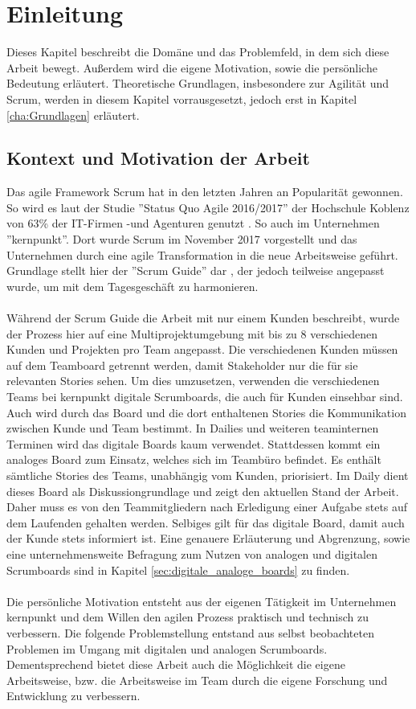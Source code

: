 \chapter{Einleitung}
\label{cha:Einleitung}

Dieses Kapitel beschreibt die Domäne und das Problemfeld, in dem sich diese Arbeit bewegt. Außerdem wird die eigene Motivation, sowie die persönliche Bedeutung erläutert. Theoretische Grundlagen, insbesondere zur Agilität und Scrum, werden in diesem Kapitel vorrausgesetzt, jedoch erst in Kapitel \ref{cha:Grundlagen} erläutert.

\section{Kontext und Motivation der Arbeit}
\label{sec:kontext_motivation}
Das agile Framework Scrum hat in den letzten Jahren an Popularität gewonnen. So wird es laut der Studie ''Status Quo Agile 2016/2017'' der Hochschule Koblenz von 63\% der IT-Firmen -und Agenturen genutzt \cite{statusquoagile}. So auch im Unternehmen ''kernpunkt''. Dort wurde Scrum im November 2017 vorgestellt und das Unternehmen durch eine agile Transformation in die neue Arbeitsweise geführt. Grundlage stellt hier der ''Scrum Guide'' dar \cite{scrumguide}, der jedoch teilweise angepasst wurde, um mit dem Tagesgeschäft zu harmonieren. 
\\ \\
Während der Scrum Guide die Arbeit mit nur einem Kunden beschreibt, wurde der Prozess hier auf eine Multiprojektumgebung mit bis zu 8 verschiedenen Kunden und Projekten pro Team angepasst. Die verschiedenen Kunden müssen auf dem Teamboard getrennt werden, damit Stakeholder nur die für sie relevanten Stories sehen. Um dies umzusetzen, verwenden die verschiedenen Teams bei kernpunkt digitale Scrumboards, die auch für Kunden einsehbar sind. Auch wird durch das Board und die dort enthaltenen Stories die Kommunikation zwischen Kunde und Team bestimmt. In Dailies und weiteren teaminternen Terminen wird das digitale Boards kaum verwendet. Stattdessen kommt ein analoges Board zum Einsatz, welches sich im Teambüro befindet. Es enthält sämtliche Stories des Teams, unabhängig vom Kunden, priorisiert. Im Daily dient dieses Board als Diskussiongrundlage und zeigt den aktuellen Stand der Arbeit. Daher muss es von den Teammitgliedern nach Erledigung einer Aufgabe stets auf dem Laufenden gehalten werden. Selbiges gilt für das digitale Board, damit auch der Kunde stets informiert ist. Eine genauere Erläuterung und Abgrenzung, sowie eine unternehmensweite Befragung zum Nutzen von analogen und digitalen Scrumboards sind in Kapitel \ref{sec:digitale_analoge_boards} zu finden. \\
\\
Die persönliche Motivation entsteht aus der eigenen Tätigkeit im Unternehmen kernpunkt und dem Willen den agilen Prozess praktisch und technisch zu verbessern. Die folgende Problemstellung entstand aus selbst beobachteten Problemen im Umgang mit digitalen und analogen Scrumboards. Dementsprechend bietet diese Arbeit auch die Möglichkeit die eigene Arbeitsweise, bzw. die Arbeitsweise im Team durch die eigene Forschung und Entwicklung zu verbessern.

